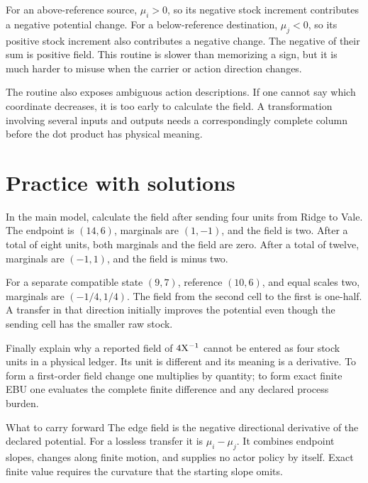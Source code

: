 For an above-reference source, \(\mu_i>0\), so its negative stock increment contributes a negative potential change. For a below-reference destination, \(\mu_j<0\), so its positive stock increment also contributes a negative change. The negative of their sum is positive field. This routine is slower than memorizing a sign, but it is much harder to misuse when the carrier or action direction changes.

The routine also exposes ambiguous action descriptions. If one cannot say which coordinate decreases, it is too early to calculate the field. A transformation involving several inputs and outputs needs a correspondingly complete column before the dot product has physical meaning.

\section{Practice with solutions}
In the main model, calculate the field after sending four units from Ridge to Vale. The endpoint is \((14,6)\), marginals are \((1,-1)\), and the field is two. After a total of eight units, both marginals and the field are zero. After a total of twelve, marginals are \((-1,1)\), and the field is minus two.

For a separate compatible state \((9,7)\), reference \((10,6)\), and equal scales two, marginals are \((-1/4,1/4)\). The field from the second cell to the first is one-half. A transfer in that direction initially improves the potential even though the sending cell has the smaller raw stock.

Finally explain why a reported field of \(4\mathrm{X}^{-1}\) cannot be entered as four stock units in a physical ledger. Its unit is different and its meaning is a derivative. To form a first-order field change one multiplies by quantity; to form exact finite EBU one evaluates the complete finite difference and any declared process burden.

\begin{intuitionbox}{What to carry forward}
The edge field is the negative directional derivative of the declared potential. For a lossless transfer it is \(\mu_i-\mu_j\). It combines endpoint slopes, changes along finite motion, and supplies no actor policy by itself. Exact finite value requires the curvature that the starting slope omits.
\end{intuitionbox}
